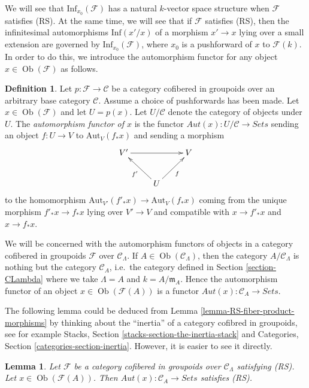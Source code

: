 \documentclass{stacks-project}
\theoremstyle{plain}
\newtheorem{lemma}[subsection]{Lemma}
\theoremstyle{definition}
\newtheorem{definition}[subsection]{Definition}
\theoremstyle{remark}
\numberwithin{equation}{subsection}
\def\Ob{\mathop{\mathrm{Ob}}\nolimits}
\begin{document}
\noindent
We will see that $\text{Inf}_{x_0}(\mathcal{F})$ has a natural $k$-vector
space structure when $\mathcal{F}$ satisfies (RS). At the same time, we will
see that if $\mathcal{F}$ satisfies (RS), then the infinitesimal automorphisms
$\text{Inf}(x'/x)$ of a morphism $x' \to x$ lying over a small
extension are governed by $\text{Inf}_{x_0}(\mathcal{F})$, where $x_0$ is
a pushforward of $x$ to $\mathcal{F}(k)$. In order to do this, we introduce
the automorphism functor for any object $x \in \Ob(\mathcal{F})$ as
follows.

\begin{definition}
\label{definition-automorphism-functor}
Let $p : \mathcal{F} \to \mathcal{C}$ be a category cofibered in groupoids
over an arbitrary base category $\mathcal{C}$. Assume a choice of pushforwards
has been made. Let $x \in \Ob(\mathcal{F})$ and let $U = p(x)$.
Let $U/\mathcal{C}$ denote the category of objects under $U$. The
{\it automorphism functor of $x$} is the functor
$\mathit{Aut}(x) : U/\mathcal{C} \to \textit{Sets}$ sending an object
$f : U \to V$ to $\text{Aut}_V(f_*x)$ and sending a morphism
$$
\xymatrix{
V' \ar[rr] &                    & V\\
          & U \ar[ul]^{f'}  \ar[ur]_f &
}
$$
to the homomorphism
$\text{Aut}_{V'}(f'_*x) \to \text{Aut}_V(f_*x)$
coming from the unique morphism $f'_*x \to f_*x$ lying over
$V' \to V$ and compatible with $x \to f'_*x$ and $x \to f_*x$.
\end{definition}

\noindent
We will be concerned with the automorphism functors of objects in a category
cofibered in groupoids $\mathcal{F}$ over $\mathcal{C}_\Lambda$. If
$A \in \Ob(\mathcal{C}_\Lambda)$, then the category
$A/\mathcal{C}_\Lambda$ is nothing but the category $\mathcal{C}_A$,
i.e.\ the category defined in Section \ref{section-CLambda}
where we take $\Lambda = A$ and $k = A/\mathfrak m_A$.
Hence the automorphism functor of an object
$x \in \Ob(\mathcal{F}(A))$ is a functor
$\mathit{Aut}(x) : \mathcal{C}_A \to \textit{Sets}$.

\medskip\noindent
The following lemma could be deduced from
Lemma \ref{lemma-RS-fiber-product-morphisms}
by thinking about the ``inertia'' of a category cofibred in groupoids,
see for example
Stacks, Section \ref{stacks-section-the-inertia-stack}
and
Categories, Section \ref{categories-section-inertia}.
However, it is easier to see it directly.

\begin{lemma}
\label{lemma-Aut-functor-RS}
Let $\mathcal{F}$ be a category cofibered in groupoids over
$\mathcal{C}_\Lambda$ satisfying (RS). Let
$x \in \Ob(\mathcal{F}(A))$. Then
$\mathit{Aut}(x): \mathcal{C}_A \to \textit{Sets}$ satisfies (RS).
\end{lemma}
\end{document}
